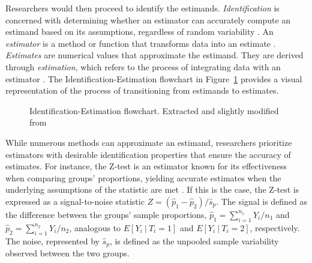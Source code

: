 \documentclass[
  authoryear,
  review,
  1p]{elsarticle}
\begin{document}
Researchers would then proceed to identify the estimands.
\emph{Identification} is concerned with determining whether an estimator
can accurately compute an estimand based on its assumptions, regardless
of random variability \citep[pp.~4]{Schuessler_et_al_2023}. An
\emph{estimator} is a method or function that transforms data into an
estimate \citep{Neal_2020}. \emph{Estimates} are numerical values that
approximate the estimand. They are derived through \emph{estimation},
which refers to the process of integrating data with an estimator
\citep{Everitt_et_al_2010}. The Identification-Estimation flowchart
\citep{McElreath_2020, Neal_2020} in Figure~\ref{fig-IEflow} provides a
visual representation of the process of transitioning from estimands to
estimates.

\begin{figure}


\caption{\label{fig-IEflow}Identification-Estimation flowchart.
Extracted and slightly modified from \citet[pp.~32]{Neal_2020}}

\end{figure}%

While numerous methods can approximate an estimand, researchers
prioritize estimators with desirable identification properties that
ensure the accuracy of estimates. For instance, the Z-test is an
estimator known for its effectiveness when comparing groups'
proportions, yielding accurate estimates when the underlying assumptions
of the statistic are met \citep{Kanji_2006}. If this is the case, the
Z-test is expressed as a signal-to-noise statistic
\(Z = (\hat{p}_{1} - \hat{p}_{2})/ \hat{s}_{p}\). The signal is defined
as the difference between the groups' sample proportions,
\(\hat{p}_{1} = \sum_{i=1}^{n_{1}}{Y_{i}/n_{1}}\) and
\(\hat{p}_{2} = \sum_{i=1}^{n_{2}}{Y_{i}/n_{2}}\), analogous to
\(E[Y_{i} \: | \: T_{i}=1]\) and \(E[Y_{i} \: | \: T_{i}=2]\),
respectively. The noise, represented by \(\hat{s}_{p}\), is defined as
the unpooled sample variability observed between the two groups.
\end{document}
